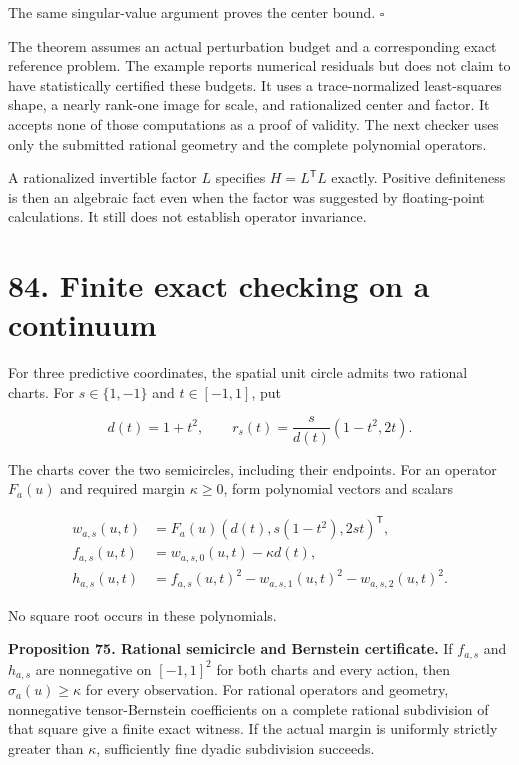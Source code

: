\documentclass[11pt,letterpaper]{article}
\begin{document}
The same singular-value argument proves the center bound. \(\square\)

The theorem assumes an actual perturbation budget and a corresponding
exact reference problem. The example reports numerical residuals but
does not claim to have statistically certified these budgets. It uses a
trace-normalized least-squares shape, a nearly rank-one image for scale,
and rationalized center and factor. It accepts none of those
computations as a proof of validity. The next checker uses only the
submitted rational geometry and the complete polynomial operators.

A rationalized invertible factor \(L\) specifies \(H=L^{\mathsf T}L\)
exactly. Positive definiteness is then an algebraic fact even when the
factor was suggested by floating-point calculations. It still does not
establish operator invariance.

\section{84. Finite exact checking on a
continuum}\label{finite-exact-checking-on-a-continuum}

For three predictive coordinates, the spatial unit circle admits two
rational charts. For \(s\in\{1,-1\}\) and \(t\in[-1,1]\), put

\[
d(t)=1+t^2,\qquad
r_s(t)=\frac{s}{d(t)}(1-t^2,2t).
\]

The charts cover the two semicircles, including their endpoints. For an
operator \(F_a(u)\) and required margin \(\kappa\geq0\), form polynomial
vectors and scalars

\[
\begin{aligned}
w_{a,s}(u,t)&=F_a(u)(d(t),s(1-t^2),2st)^{\mathsf T},\\
f_{a,s}(u,t)&=w_{a,s,0}(u,t)-\kappa d(t),\\
h_{a,s}(u,t)&=f_{a,s}(u,t)^2-w_{a,s,1}(u,t)^2-w_{a,s,2}(u,t)^2.
\end{aligned}
\]

No square root occurs in these polynomials.

\textbf{Proposition 75. Rational semicircle and Bernstein certificate.}
If \(f_{a,s}\) and \(h_{a,s}\) are nonnegative on \([-1,1]^2\) for both
charts and every action, then \(\sigma_a(u)\geq\kappa\) for every
observation. For rational operators and geometry, nonnegative
tensor-Bernstein coefficients on a complete rational subdivision of that
square give a finite exact witness. If the actual margin is uniformly
strictly greater than \(\kappa\), sufficiently fine dyadic subdivision
succeeds.
\end{document}
